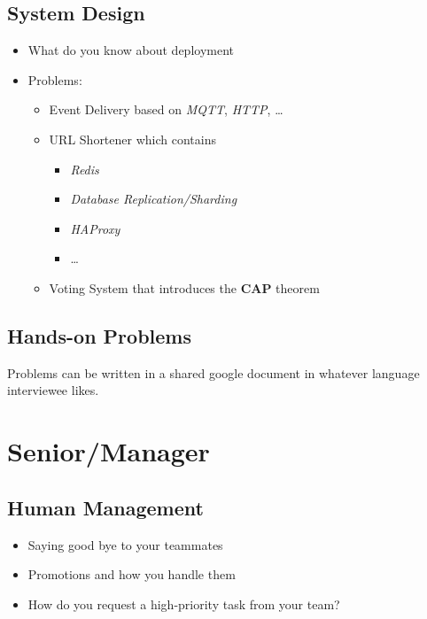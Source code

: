 \documentclass[]{book}
\begin{document}
\section{System Design}

\begin{itemize}
  \item What do you know about deployment
  \item Problems:
    \begin{itemize}
      \item Event Delivery based on \textit{MQTT}, \textit{HTTP}, \ldots
      \item URL Shortener which contains
        \begin{itemize}
          \item \textit{Redis}
          \item \textit{Database Replication/Sharding}
          \item \textit{HAProxy}
          \item \ldots
        \end{itemize}
      \item Voting System that introduces the \textbf{CAP} theorem
    \end{itemize}
\end{itemize}

\section{Hands-on Problems}

Problems can be written in a shared google document in whatever language interviewee likes.







\chapter{Senior/Manager}

\section{Human Management}

\begin{itemize}
  \item Saying good bye to your teammates
  \item Promotions and how you handle them
  \item How do you request a high-priority task from your team?
\end{itemize}
\end{document}
